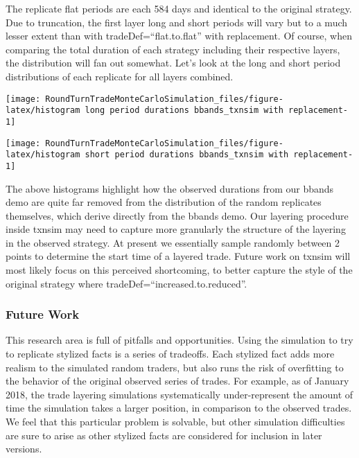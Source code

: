 The replicate flat periods are each 584 days and identical to the
original strategy. Due to truncation, the first layer long and short
periods will vary but to a much lesser extent than with
tradeDef=``flat.to.flat'' with replacement. Of course, when comparing
the total duration of each strategy including their respective layers,
the distribution will fan out somewhat. Let's look at the long and short
period distributions of each replicate for all layers combined.

\begin{Schunk}

\texttt{[image: RoundTurnTradeMonteCarloSimulation\_files/figure-latex/histogram long period durations bbands\_txnsim with replacement-1]} \end{Schunk}

\begin{Schunk}

\texttt{[image: RoundTurnTradeMonteCarloSimulation\_files/figure-latex/histogram short period durations bbands\_txnsim with replacement-1]} \end{Schunk}

The above histograms highlight how the observed durations from our
bbands demo are quite far removed from the distribution of the random
replicates themselves, which derive directly from the bbands demo. Our
layering procedure inside txnsim may need to capture more granularly the
structure of the layering in the observed strategy. At present we
essentially sample randomly between 2 points to determine the start time
of a layered trade. Future work on txnsim will most likely focus on this
perceived shortcoming, to better capture the style of the original
strategy where tradeDef=``increased.to.reduced''.

\hypertarget{future-work}{%
\subsubsection{Future Work}\label{future-work}}

This research area is full of pitfalls and opportunities. Using the
simulation to try to replicate stylized facts is a series of tradeoffs.
Each stylized fact adds more realism to the simulated random traders,
but also runs the risk of overfitting to the behavior of the original
observed series of trades. For example, as of January 2018, the trade
layering simulations systematically under-represent the amount of time
the simulation takes a larger position, in comparison to the observed
trades. We feel that this particular problem is solvable, but other
simulation difficulties are sure to arise as other stylized facts are
considered for inclusion in later versions.

